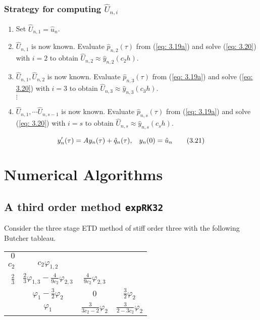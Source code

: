 \documentclass[12pt]{article}
\begin{document}
\subsubsection{Strategy for computing $\hat{U}_{n,i}$}
\begin{enumerate}
\item Set $\hat{U}_{n,1} = \hat{u}_n$.
\item $\hat{U}_{n,1}$ is now known. Evaluate $\hat{p}_{n,2}(\tau)$ from (\ref{eq: 3.19a}) and solve (\ref{eq: 3.20}) with $i=2$ to obtain $\hat{U}_{n,2} \approx \hat{y}_{n,2}(c_2h)$.
\item $\hat{U}_{n,1}, \hat{U}_{n,2} $ is now known. Evaluate $\hat{p}_{n,3}(\tau)$ from (\ref{eq: 3.19a}) and solve (\ref{eq: 3.20}) with $i=3$ to obtain $\hat{U}_{n,3} \approx \hat{y}_{n,3}(c_3h)$.\\
$\vdots$
\item $\hat{U}_{n,1},\cdots \hat{U}_{n,s-1} $ is now known. Evaluate $\hat{p}_{n,s}(\tau)$ from (\ref{eq: 3.19a}) and solve (\ref{eq: 3.20}) with $i=s$ to obtain $\hat{U}_{n,s} \approx \hat{y}_{n,s}(c_sh)$.
\end{enumerate}

\begin{equation}
y'_{n}(\tau) = Ay_{n}(\tau) + \hat{q}_{n}(\tau), \hspace{0.3cm} y_{n}(0) = \hat{u}_n 
\tag{3.21} \label{eq: 3.21}
\end{equation}
\section{Numerical Algorithms} 
\subsection{A third order method \texttt{expRK32}} 
Consider the three stage ETD method of stiff order three with the following Butcher tableau.
\begin{center}
\begin{table}[h!]
\begin{tabular}{r|c c c}
$0$ &  &  &  \\
$c_2$ & $c_2\varphi_{1,2}$ &  \\
$\frac{2}{3}$ & $\frac{2}{3}\varphi_{1,3} - \frac{4}{9c_2}\varphi_{2,3}$ & $\frac{4}{9c_2}\varphi_{2,3}$\\
\hline 
 & $\varphi_1 - \frac{3}{2}\varphi_2 $ & $0$ & $\frac{3}{2}\varphi_2$\\
 & $\varphi_1$ & $\frac{3}{3c_2 - 2}\varphi_2$ & $\frac{3}{2 - 3c_2}\varphi_2$ 
\end{tabular}
\end{table}
\end{center}
\end{document}
